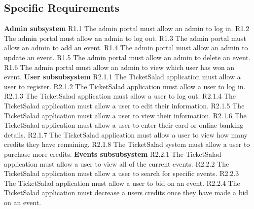 \documentclass[11pt]{article}
\begin{document}
	\subsection{Specific Requirements}
	\textbf{Admin subsystem}
	\newline
	R1.1 The admin portal must allow an admin to log in.
	\newline
	R1.2 The admin portal must allow an admin to log out.
	\newline
	R1.3 The admin portal must allow an admin to add an event.
	\newline
	R1.4 The admin portal must allow an admin to update an event.
	\newline
	R1.5 The admin portal must allow an admin to delete an event.
	\newline
	R1.6 The admin portal must allow an admin to view which user has won an event.
	\newline
	\newline
	\textbf{User subsubsystem}
	\newline
	R2.1.1 The TicketSalad application must allow a user to register.
	\newline
	R2.1.2 The TicketSalad application must allow a user to log in.
	\newline
	R2.1.3 The TicketSalad application must allow a user to log out.
	\newline
	R2.1.4 The TicketSalad application must allow a user to edit their information.
	\newline
	R2.1.5 The TicketSalad application must allow a user to view their information.
	\newline
	R2.1.6 The TicketSalad application must allow a user to enter their card or online banking details.
	\newline 
	R2.1.7 The TicketSalad application must allow a user to view how many credits they have remaining.
	\newline
	R2.1.8 The TicketSalad system must allow a user to purchase more credits.
	\newline
	\newline
	\textbf{Events subsubsystem}
	\newline
	R2.2.1 The TicketSalad application must allow a user to view all of the current events.
	\newline
	R2.2.2 The TicketSalad application must allow a user to search for specific events.
	\newline
	R2.2.3 The TicketSalad application must allow a user to bid on an event.
	\newline 
	R2.2.4 The TicketSalad application must decrease a users credits once they have made a bid on an event.
	\newline
	\newline
	
\end{document}
